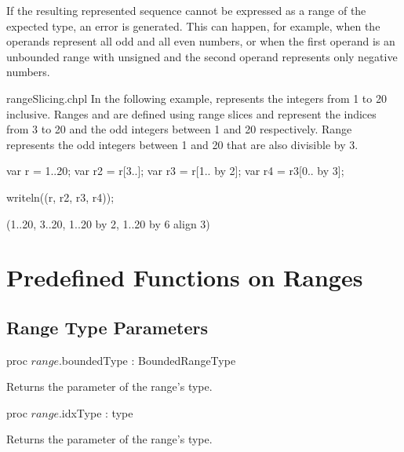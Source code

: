 If the resulting represented sequence cannot be expressed as a range of the
expected type, an error is generated. This can happen, for example, when
the operands represent all odd and all even numbers, or when the first
operand is an unbounded range with unsigned  and the second
operand represents only negative numbers.

\begin{chapelexample}{rangeSlicing.chpl}
In the following example,  represents the integers from 1 to
20 inclusive.  Ranges  and  are defined using range
slices and represent the indices from 3 to 20 and the odd integers
between 1 and 20 respectively. Range  represents the odd
integers between 1 and 20 that are also divisible by 3.
\begin{chapel}
var r = 1..20;
var r2 = r[3..];
var r3 = r[1.. by 2];
var r4 = r3[0.. by 3];
\end{chapel}
\begin{chapelpost}
writeln((r, r2, r3, r4));
\end{chapelpost}
\begin{chapeloutput}
(1..20, 3..20, 1..20 by 2, 1..20 by 6 align 3)
\end{chapeloutput}
\end{chapelexample}


\section{Predefined Functions on Ranges}
\label{Predefined_Range_Functions}

\subsection{Range Type Parameters}
\label{Range_Type_Accessors}

\begin{protohead}
proc $range$.boundedType : BoundedRangeType
\end{protohead}
\begin{protobody}
Returns the  parameter of the range's type.
\end{protobody}

\begin{protohead}
proc $range$.idxType : type
\end{protohead}
\begin{protobody}
Returns the  parameter of the range's type.
\end{protobody}

